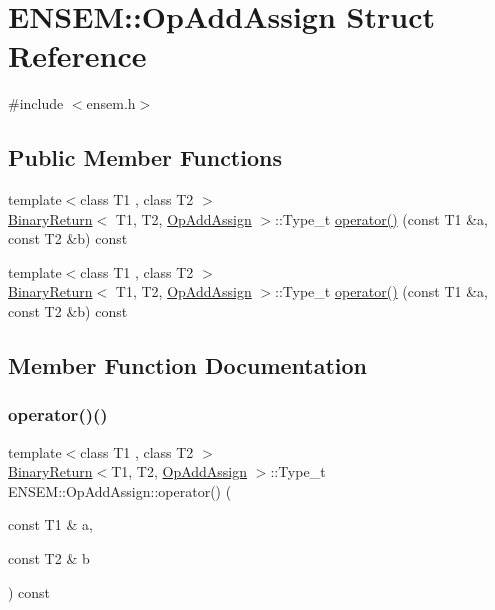 \hypertarget{structENSEM_1_1OpAddAssign}{}\section{E\+N\+S\+EM\+:\+:Op\+Add\+Assign Struct Reference}
\label{structENSEM_1_1OpAddAssign}


{\ttfamily \#include $<$ensem.\+h$>$}

\subsection*{Public Member Functions}
\begin{DoxyCompactItemize}
\item 
{\footnotesize template$<$class T1 , class T2 $>$ }\\\mbox{\hyperlink{structENSEM_1_1BinaryReturn}{Binary\+Return}}$<$ T1, T2, \mbox{\hyperlink{structENSEM_1_1OpAddAssign}{Op\+Add\+Assign}} $>$\+::Type\+\_\+t \mbox{\hyperlink{structENSEM_1_1OpAddAssign_a115e2f2eb7eaf306b7af0ad00e7801b8}{operator()}} (const T1 \&a, const T2 \&b) const
\item 
{\footnotesize template$<$class T1 , class T2 $>$ }\\\mbox{\hyperlink{structENSEM_1_1BinaryReturn}{Binary\+Return}}$<$ T1, T2, \mbox{\hyperlink{structENSEM_1_1OpAddAssign}{Op\+Add\+Assign}} $>$\+::Type\+\_\+t \mbox{\hyperlink{structENSEM_1_1OpAddAssign_a115e2f2eb7eaf306b7af0ad00e7801b8}{operator()}} (const T1 \&a, const T2 \&b) const
\end{DoxyCompactItemize}


\subsection{Member Function Documentation}
\mbox{\label{structENSEM_1_1OpAddAssign_a115e2f2eb7eaf306b7af0ad00e7801b8}} 
\subsubsection{\texorpdfstring{operator()()}{operator()()}\hspace{0.1cm}{\footnotesize\ttfamily [1/2]}}
{\footnotesize\ttfamily template$<$class T1 , class T2 $>$ \\
\mbox{\hyperlink{structENSEM_1_1BinaryReturn}{Binary\+Return}}$<$T1, T2, \mbox{\hyperlink{structENSEM_1_1OpAddAssign}{Op\+Add\+Assign}} $>$\+::Type\+\_\+t E\+N\+S\+E\+M\+::\+Op\+Add\+Assign\+::operator() (\begin{DoxyParamCaption}\item[{const T1 \&}]{a,  }\item[{const T2 \&}]{b }\end{DoxyParamCaption}) const\hspace{0.3cm}{\ttfamily [inline]}}

